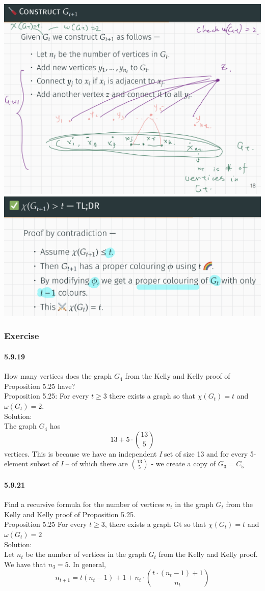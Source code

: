 \documentclass{article}
\begin{document}
\includegraphics{0096}\\
\includegraphics{0097}\\
\subsubsection{Exercise}
\paragraph{5.9.19}
How many vertices does the graph $G_4$ from the Kelly and Kelly proof of Proposition 5.25 have?\\
Proposition 5.25: For every $t\ge 3$ there exists a graph so that $\chi(G_t)=t$ and $\omega(G_t)=2$.\\
Solution:\\
The graph $G_4$ has $$13+5\cdot \binom{13}{5}$$ vertices. This is because we have an independent \textit{I} set of size 13 and for every 5-element subset of \textit{I} – of which there are $\binom{13}{5}$ -  we create a copy of $G_3=C_5$
\paragraph{5.9.21}
Find a recursive formula for the number of vertices $n_t$ in the graph $G_t$ from the Kelly and Kelly proof of Proposition 5.25.\\
Proposition 5.25 For every $t\ge 3$, there exists a graph Gt so that $\chi(G_t) = t$ and $\omega(G_t) = 2$\\
Solution:\\
Let $n_t$ be the number of vertices in the graph $G_t$ from the Kelly and Kelly proof. We have that $n_3 = 5$. In general, $$n_{t+1}=t(n_t-1)+1+n_t\cdot \binom{t\cdot (n_t-1)+1}{n_t}$$
\end{document}

